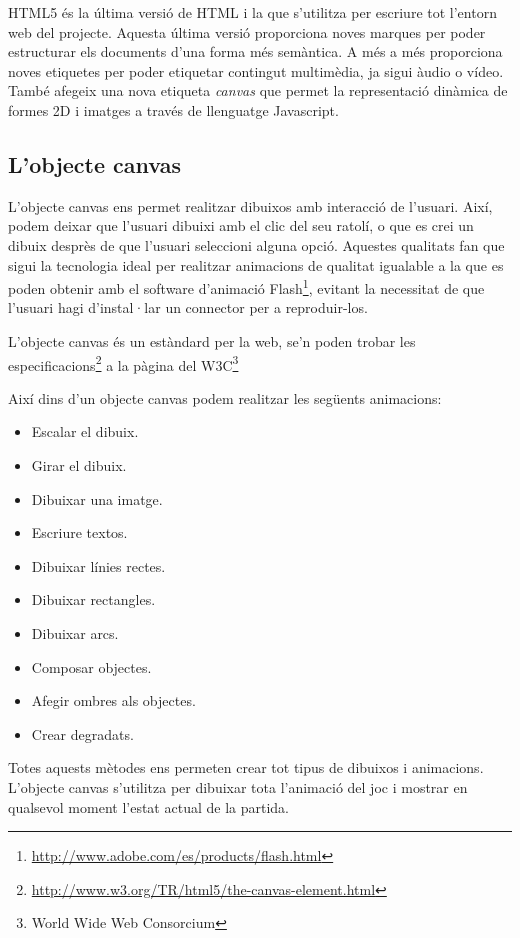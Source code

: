 HTML5 és la última versió de HTML i la que s'utilitza per escriure tot l'entorn web del projecte. Aquesta última versió proporciona noves marques per poder estructurar els documents d'una forma més semàntica. A més a més proporciona noves etiquetes per poder etiquetar contingut multimèdia, ja sigui àudio o vídeo. També afegeix una nova etiqueta \emph{canvas} que permet la representació dinàmica de formes 2D i imatges a través de llenguatge Javascript. 

\subsection{L'objecte canvas}

L'objecte canvas ens permet realitzar dibuixos amb interacció de l'usuari. Així, podem deixar que l'usuari dibuixi amb el clic del seu ratolí, o que es crei un dibuix desprès de que l'usuari seleccioni alguna opció. Aquestes qualitats fan que sigui la tecnologia ideal per realitzar animacions de qualitat igualable a la que es poden obtenir amb el software d'animació Flash\footnote{\url{http://www.adobe.com/es/products/flash.html}}, evitant la necessitat de que l'usuari hagi d'instal·lar un connector per a reproduir-los. 

L'objecte canvas és un estàndard per la web, se'n poden trobar les especificacions\footnote{\url{http://www.w3.org/TR/html5/the-canvas-element.html}} a la pàgina del W3C\footnote{World Wide Web Consorcium}

Així dins d'un objecte canvas podem realitzar les següents animacions: 

\begin{itemize}
\item{Escalar el dibuix.}
\item{Girar el dibuix.}
\item{Dibuixar una imatge.}
\item{Escriure textos.}
\item{Dibuixar línies rectes.}
\item{Dibuixar rectangles.}
\item{Dibuixar arcs.}
\item{Composar objectes.}
\item{Afegir ombres als objectes.}
\item{Crear degradats.}
\end{itemize}

Totes aquests mètodes ens permeten crear tot tipus de dibuixos i animacions. L'objecte canvas s'utilitza per dibuixar tota l'animació del joc i mostrar en qualsevol moment l'estat actual de la partida. 


